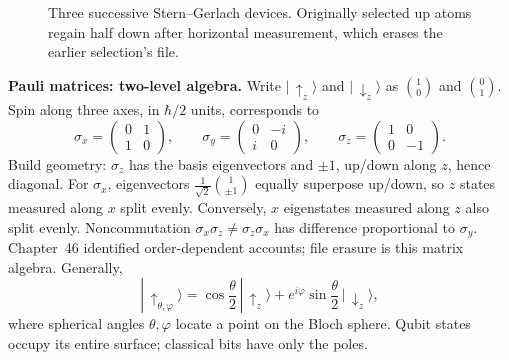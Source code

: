 \begin{figure}[htbp]
\centering
{}
\caption{Three successive Stern--Gerlach devices. Originally selected up atoms regain half down after horizontal measurement, which erases the earlier selection's file.}
\end{figure}

\begin{mathbridge}
\textbf{Pauli matrices: two-level algebra.} Write $|\,{\uparrow}_z\rangle$ and $|\,{\downarrow}_z\rangle$ as $\binom{1}{0}$ and $\binom{0}{1}$. Spin along three axes, in $\hbar/2$ units, corresponds to
\[
\sigma_x=\begin{pmatrix}0&1\\[2pt]1&0\end{pmatrix},\qquad
\sigma_y=\begin{pmatrix}0&-i\\[2pt]i&0\end{pmatrix},\qquad
\sigma_z=\begin{pmatrix}1&0\\[2pt]0&-1\end{pmatrix}.
\]
Build geometry: $\sigma_z$ has the basis eigenvectors and $\pm1$, up/down along $z$, hence diagonal. For $\sigma_x$, eigenvectors $\tfrac{1}{\sqrt2}\binom{1}{\pm1}$ equally superpose up/down, so $z$ states measured along $x$ split evenly. Conversely, $x$ eigenstates measured along $z$ also split evenly. Noncommutation $\sigma_x\sigma_z\neq\sigma_z\sigma_x$ has difference proportional to $\sigma_y$. Chapter~46 identified order-dependent accounts; file erasure is this matrix algebra. Generally,
\[
|\,{\uparrow}_{\theta,\varphi}\rangle=\cos\frac{\theta}{2}\,|\,{\uparrow}_z\rangle+e^{i\varphi}\sin\frac{\theta}{2}\,|\,{\downarrow}_z\rangle ,
\]
where spherical angles $\theta,\varphi$ locate a point on the Bloch sphere. Qubit states occupy its entire surface; classical bits have only the poles.
\end{mathbridge}

